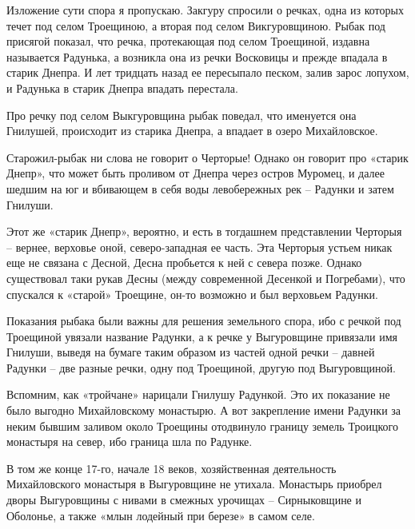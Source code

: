 Изложение сути спора я пропускаю. Закгуру спросили о речках, одна из которых течет под селом Троещиною, а вторая под селом Викгуровщиною. Рыбак под присягой показал, что речка, протекающая под селом Троещиной, издавна называется Радунька, а возникла она из речки Восковицы и прежде впадала в старик Днепра. И лет тридцать назад ее пересыпало песком, залив зарос лопухом, и Радунька в старик Днепра впадать перестала. 

Про речку под селом Выкгуровщина рыбак поведал, что именуется она Гнилушей, происходит из старика Днепра, а впадает в озеро Михайловское.

Старожил-рыбак ни слова не говорит о Черторые! Однако он говорит про «старик Днепр», что может быть проливом от Днепра через остров Муромец, и далее шедшим на юг и вбивающем в себя воды левобережных рек – Радунки и затем Гнилуши.

Этот же «старик Днепр», вероятно, и есть в тогдашнем представлении Черторыя – вернее, верховье оной, северо-западная ее часть. Эта Черторыя устьем никак еще не связана с Десной, Десна пробьется к ней с севера позже. Однако существовал таки рукав Десны (между современной Десенкой и Погребами), что спускался к «старой» Троещине, он-то возможно и был верховьем Радунки. 

Показания рыбака были важны для решения земельного спора, ибо с речкой под Троещиной увязали название Радунки, а к речке у Выгуровщине привязали имя Гнилуши, выведя на бумаге таким образом из частей одной речки – давней Радунки – две разные речки, одну под Троещиной, другую под Выгуровщиной.

Вспомним, как «тройчане» нарицали Гнилушу Радункой. Это их показание не было выгодно Михайловскому монастырю. А вот закрепление имени Радунки за неким бывшим заливом около Троещины отодвинуло границу земель  Троицкого монастыря на север, ибо граница шла по Радунке.


В том же конце 17-го, начале 18 веков, хозяйственная деятельность Михайловского монастыря в Выгуровщине не утихала. Монастырь приобрел дворы Выгуровщины с нивами в смежных урочищах – Сирныковщине и Оболонье, а также «млын лодейный при березе» в самом селе.

